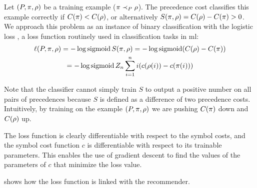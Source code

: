 Let $(P, \pi, \rho)$ be a training example ($\pi \prec_{P} \rho$).
The precedence cost classifies this example correctly if $C(\pi) < C(\rho)$,
or alternatively $S(\pi, \rho) = C(\rho) - C(\pi) > 0$.
We approach this problem as an instance of binary classification with the logistic loss \cite{Mohri2018},
a loss function routinely used in classification tasks in \acrlong{ml}:
\begin{multline*}
\ell(P, \pi, \rho)
= - \log \operatorname{sigmoid} S(\pi, \rho)
= - \log \operatorname{sigmoid} (C(\rho) - C(\pi)) \\
= - \log \operatorname{sigmoid} Z_n \sum_{i=1}^n i (c(\rho(i)) - c(\pi(i)))
\end{multline*}

Note that the classifier cannot simply train $S$ to output a positive number on all pairs of precedences
because $S$ is defined as a difference of two precedence costs.
Intuitively, by training on the example $(P, \pi, \rho)$
we are pushing $C(\pi)$ down and $C(\rho)$ up.

The loss function is clearly differentiable with respect to the symbol costs,
and the symbol cost function $c$ is differentiable with respect to its trainable parameters.
This enables the use of gradient descent to find the values of the parameters of $c$
that minimize the loss value.

 shows how the loss function is linked with the recommender.
